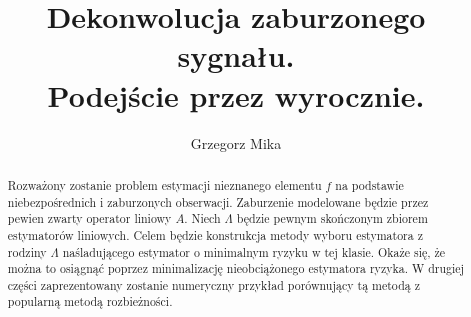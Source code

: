 \documentclass{article}
\title{Dekonwolucja zaburzonego sygnału.\\Podejście przez wyrocznie.}
\author{Grzegorz Mika}
\begin{document}
\maketitle
\begin{abstract}
Rozważony zostanie  problem estymacji nieznanego elementu $f$ na podstawie niebezpośrednich i zaburzonych obserwacji. Zaburzenie modelowane będzie przez pewien zwarty operator liniowy $A$. Niech $\Lambda$ będzie pewnym skończonym zbiorem estymatorów liniowych. Celem będzie konstrukcja metody wyboru estymatora z rodziny $\Lambda$ naśladującego estymator o minimalnym ryzyku w tej klasie. Okaże się, że można to osiągnąć poprzez minimalizację nieobciążonego estymatora ryzyka. W drugiej części zaprezentowany zostanie numeryczny przykład porównujący tą metodą z popularną metodą rozbieżności.
\end{abstract}
\end{document}
